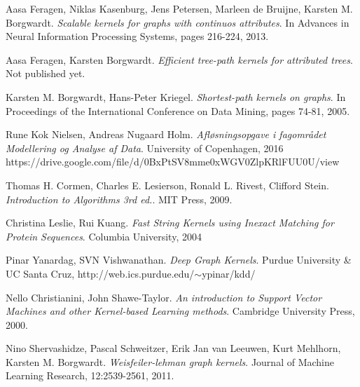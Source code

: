 \documentclass{article}
\begin{document}
\renewcommand\refname{References}
\begin{thebibliography}{9}
		Aasa Feragen, Niklas Kasenburg, Jens Petersen, Marleen de Bruijne, Karsten M. Borgwardt.
		\emph{Scalable kernels for graphs with continuos attributes}.
		In Advances in Neural Information Processing Systems, pages 216-224, 2013.

		Aasa Feragen, Karsten Borgwardt.
		\emph{Efficient tree-path kernels for attributed trees}.
		Not published yet.

		Karsten M. Borgwardt, Hans-Peter Kriegel.
		\emph{Shortest-path kernels on graphs}.
		In Proceedings of the International Conference on Data Mining, pages 74-81, 2005.
		
		Rune Kok Nielsen, Andreas Nugaard Holm.
		\emph{Afløsningsopgave i fagområdet Modellering og Analyse af Data}.
		University of Copenhagen, 2016\\
		https://drive.google.com/file/d/0BxPtSV8mme0xWGV0ZlpKRlFUU0U/view
		
		Thomas H. Cormen, Charles E. Lesierson, Ronald L. Rivest, Clifford Stein.
		\emph{Introduction to Algorithms 3rd ed.}.
		MIT Press, 2009.
		
		Christina Leslie, Rui Kuang.
		\emph{Fast String Kernels using Inexact Matching for Protein Sequences}.
		Columbia University, 2004
		
		Pinar Yanardag, SVN Vishwanathan.
		\emph{Deep Graph Kernels}.
		Purdue University \& UC Santa Cruz, http://web.ics.purdue.edu/$\sim$ypinar/kdd/
		
		Nello Christianini, John Shawe-Taylor.
		\emph{An introduction to Support Vector Machines and other Kernel-based Learning methods}.
		Cambridge University Press, 2000.
		
		Nino Shervashidze, Pascal Schweitzer, Erik Jan van Leeuwen, Kurt
		Mehlhorn, Karsten M. Borgwardt.
		\emph{Weisfeiler-lehman graph kernels}.
		Journal	of Machine Learning Research, 12:2539-2561, 2011.
		
\end{thebibliography}
\end{document}
